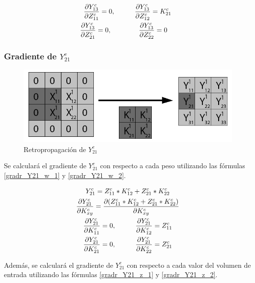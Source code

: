 \begin{gather}
	\frac{\partial Y^c_{13}}{\partial Z^c_{11}} = 0, \hspace{10mm} \frac{\partial Y^c_{13}}{\partial Z^c_{12}} = K^c_{21} \label{gradr_Y13_z_1} \\
	\frac{\partial Y^c_{13}}{\partial Z^c_{21}} = 0, \hspace{14mm} \frac{\partial Y^c_{13}}{\partial Z^c_{22}} = 0 \hspace{4mm} \label{gradr_Y13_z_2}
\end{gather}


\subsubsection{Gradiente de $Y^c_{21}$}

\begin{figure}[H]
	\centering
	\includegraphics[width=0.8\linewidth]{imagenes/conv_back_padding_4.jpg} 
	\caption{Retropropagación de $Y^c_{21}$}
\end{figure}

Se calculará el gradiente de $Y^c_{21}$ con respecto a cada peso utilizando las fórmulas \ref{gradr_Y21_w_1} y \ref{gradr_Y21_w_2}.


\begin{gather}
	Y^c_{21} = Z^c_{11} * K^c_{12} + Z^c_{21} * K^c_{22} \\
	\frac{\partial Y^c_{21}}{\partial K^c_{xy}} = \frac{\partial (Z^c_{11} * K^c_{12} + Z^c_{21} * K^c_{22})}{\partial K^c_{xy}} \\
	\frac{\partial Y^c_{21}}{\partial K^c_{11}} = 0, \hspace{10mm} \frac{\partial Y^c_{21}}{\partial K^c_{12}} = Z^c_{11} \label{gradr_Y21_w_1} \\
	\frac{\partial Y^c_{21}}{\partial K^c_{21}} = 0, \hspace{10mm} \frac{\partial Y^c_{21}}{\partial K^c_{22}} = Z^c_{21} \label{gradr_Y21_w_2}
\end{gather}

Además, se calculará el gradiente de $Y^c_{21}$ con respecto a cada valor del volumen de entrada utilizando las fórmulas \ref{gradr_Y21_z_1} y \ref{gradr_Y21_z_2}.

